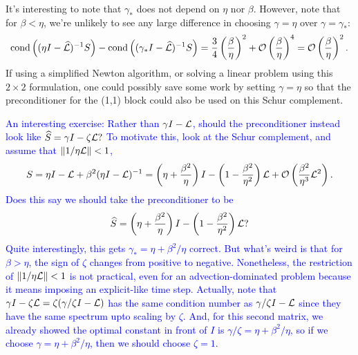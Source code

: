 \documentclass[a4paper,10pt]{article}
\newcommand{\tcb}{\textcolor{blue}}
\begin{document}
{It's interesting to note that $\gamma_*$ does not depend on $\eta$ nor $\beta$. However, note that for $\beta < \eta$, we're unlikely to see any large difference in choosing $\gamma = \eta$ over $\gamma = \gamma_*$:
\begin{align}
\textnormal{cond}\left((\eta I- \widehat{\mathcal{L}})^{-1}S\right)
-
\textnormal{cond}\left((\gamma_* I- \widehat{\mathcal{L}})^{-1}S\right)
=
\frac{3}{4} \left( \frac{\beta}{\eta} \right)^2 + {\cal O}\left( \frac{\beta}{\eta} \right)^4 = {\cal O} \left( \frac{\beta}{\eta} \right)^2.
\end{align}
If using a simplified Newton algorithm, or solving a linear problem using this $2 \times 2$ formulation, one could possibly save some work by setting $\gamma = \eta$ so that the preconditioner for the (1,1) block could also be used on this Schur complement.

\newpage
\tcb{An interesting exercise: Rather than $\gamma I - {\cal L}$, should the preconditioner instead look like $\widehat{S} = \gamma I - \zeta {\cal L}?$ To motivate this, look at the Schur complement, and assume that $\Vert 1/\eta {\cal L} \Vert < 1$,
\begin{align}
S = \eta I - {\cal L}  + \beta^2 (\eta I - {\cal L})^{-1} = \left( \eta + \frac{\beta^2}{\eta} \right) I - \left(1 - \frac{\beta^2}{\eta^2} \right) {\cal L} + {\cal O}\left( \frac{\beta^2}{\eta^3} {\cal L}^2 \right).
\end{align}
Does this say we should take the preconditioner to be
\begin{align}
\widehat{S} = \left( \eta + \frac{\beta^2}{\eta} \right) I - \left(1 - \frac{\beta^2}{\eta^2} \right) {\cal L}?
\end{align}
Quite interestingly, this gets $\gamma_* = \eta + \beta^2 / \eta$ correct. But what's weird is that for $\beta > \eta$, the sign of $\zeta$ changes from positive to negative. Nonetheless, the restriction of $\Vert 1/\eta {\cal L} \Vert < 1$ is not practical, even for an advection-dominated problem because it means imposing an explicit-like time step.
%
Actually, note that $\gamma I - \zeta {\cal L} = \zeta ( \gamma /\zeta I - {\cal L})$  has the same condition number as $\gamma/ \zeta  I - {\cal L}$ since they have the same spectrum upto scaling by $\zeta$. And, for this second matrix, we already showed the optimal constant in front of $I$ is $\gamma / \zeta = \eta + \beta^2 / \eta$, so if we choose $\gamma = \eta + \beta^2 / \eta$, then we should choose $\zeta = 1$.
}


\newpage
}
\end{document}
